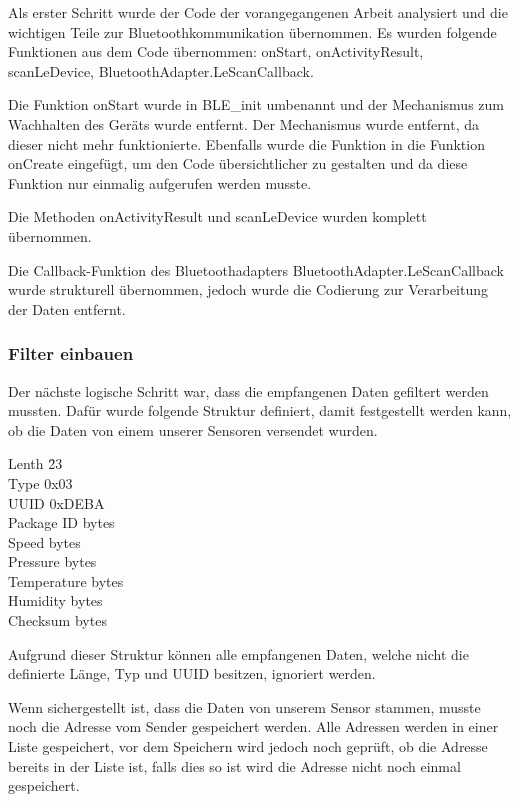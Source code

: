 Als erster Schritt wurde der Code der vorangegangenen Arbeit analysiert und die wichtigen Teile zur Bluetoothkommunikation übernommen. Es wurden folgende Funktionen aus dem Code übernommen: onStart, onActivityResult, scanLeDevice, BluetoothAdapter.LeScanCallback.

Die Funktion onStart wurde in BLE\_init umbenannt und der Mechanismus zum Wachhalten des Geräts wurde entfernt. Der Mechanismus wurde entfernt, da dieser nicht mehr funktionierte. Ebenfalls wurde die Funktion in die Funktion onCreate eingefügt, um den Code übersichtlicher zu gestalten und da diese Funktion nur einmalig aufgerufen werden musste.
 
Die Methoden onActivityResult und scanLeDevice wurden komplett übernommen.

Die Callback-Funktion des Bluetoothadapters BluetoothAdapter.LeScanCallback wurde strukturell übernommen, jedoch wurde die Codierung zur Verarbeitung der Daten entfernt.

\subsubsection{Filter einbauen}
Der nächste logische Schritt war, dass die empfangenen Daten gefiltert werden mussten. Dafür wurde folgende Struktur definiert, damit festgestellt werden kann, ob die Daten von einem unserer Sensoren versendet wurden.


\begin{tabbing}
	Lenth \quad\=		23\\[0.8ex]
	Type\>				0x03\\
	UUID\>				0xDEBA\\
	Package ID bytes\\
	Speed bytes\\
	Pressure bytes\\
	Temperature bytes\\
	Humidity bytes\\
	Checksum bytes\\
\end{tabbing}
Aufgrund dieser Struktur können alle empfangenen Daten, welche nicht die definierte Länge, Typ und UUID besitzen, ignoriert werden.

Wenn sichergestellt ist, dass die Daten von unserem Sensor stammen, musste noch die Adresse vom Sender gespeichert werden. Alle Adressen werden in einer Liste gespeichert, vor dem Speichern wird jedoch noch geprüft, ob die Adresse bereits in der Liste ist, falls dies so ist wird die Adresse nicht noch einmal gespeichert.

